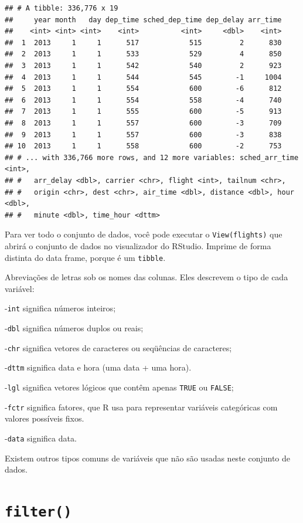 \documentclass[]{book}
\begin{document}
\begin{verbatim}
## # A tibble: 336,776 x 19
##     year month   day dep_time sched_dep_time dep_delay arr_time
##    <int> <int> <int>    <int>          <int>     <dbl>    <int>
##  1  2013     1     1      517            515         2      830
##  2  2013     1     1      533            529         4      850
##  3  2013     1     1      542            540         2      923
##  4  2013     1     1      544            545        -1     1004
##  5  2013     1     1      554            600        -6      812
##  6  2013     1     1      554            558        -4      740
##  7  2013     1     1      555            600        -5      913
##  8  2013     1     1      557            600        -3      709
##  9  2013     1     1      557            600        -3      838
## 10  2013     1     1      558            600        -2      753
## # ... with 336,766 more rows, and 12 more variables: sched_arr_time <int>,
## #   arr_delay <dbl>, carrier <chr>, flight <int>, tailnum <chr>,
## #   origin <chr>, dest <chr>, air_time <dbl>, distance <dbl>, hour <dbl>,
## #   minute <dbl>, time_hour <dttm>
\end{verbatim}

Para ver todo o conjunto de dados, você pode executar o \texttt{View(flights)} que abrirá o conjunto de dados no visualizador do RStudio. Imprime de forma distinta do data frame, porque é um \texttt{tibble}.

Abreviações de letras sob os nomes das colunas. Eles descrevem o tipo de cada variável:

-\texttt{int} significa números inteiros;

-\texttt{dbl} significa números duplos ou reais;

-\texttt{chr} significa vetores de caracteres ou seqüências de caracteres;

-\texttt{dttm} significa data e hora (uma data + uma hora).

-\texttt{lgl} significa vetores lógicos que contêm apenas \texttt{TRUE} ou \texttt{FALSE};

-\texttt{fctr} significa fatores, que R usa para representar variáveis categóricas com valores possíveis fixos.

-\texttt{data} significa data.

Existem outros tipos comuns de variáveis que não são usadas neste conjunto de dados.

\hypertarget{filter-1}{%
\section{\texorpdfstring{\texttt{filter()}}{filter()}}\label{filter-1}}
\end{document}
